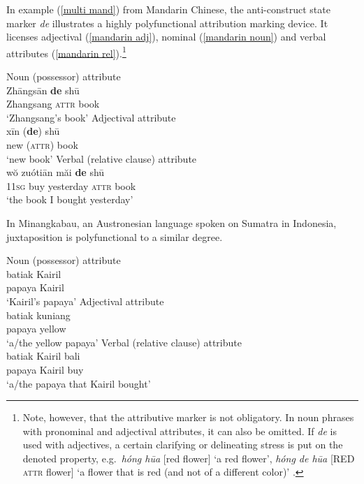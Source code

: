In example (\ref{multi mand}) from Mandarin Chinese, the anti-construct state marker \textit{de} illustrates a highly polyfunctional attribution marking device. It licenses adjectival (\ref{mandarin adj}), nominal (\ref{mandarin noun}) and verbal attributes (\ref{mandarin rel}).\footnote{Note, however, that the attributive marker is not obligatory. In noun phrases with pronominal and adjectival attributes, it can also be omitted. If \textit{de} is used with adjectives, a certain clarifying or delineating stress is put on the denoted property, e.g.~\textit{hóng hūa} [red flower] ‘a red flower’, \textit{hóng de hūa} [RED \textsc{attr} flower] ‘a flower that is red (and not of a different color)’ \citep[119–123]{li-etal1981}.}
\begin{exe}
\ex
{} \label{multi mand}
\begin{xlist}
\ex	\textrm{Noun (possessor) attribute}\\
\gll	Zhāngsān 	\textbf{de} 	shū\\
	Zhangsang 	{\textsc{attr}} 	book\\
\glt	‘Zhangsang's book’\label{mandarin noun}
\ex	\textrm{Adjectival attribute}\\
\gll	xīn 		(\textbf{de}) 	shū\\
	new	 	({\textsc{attr}}) 	book\\
\glt	‘new book’\label{mandarin adj}
\ex	\textrm{Verbal (relative clause) attribute}\\
\gll	wŏ zuótiān 	măi 	\textbf{de} 	shū\\
	1\textsc{1sg} 	buy	yesterday 	{\textsc{attr}} 	book\\
\glt	‘the book I bought yesterday’\label{mandarin rel}
\end{xlist}
\end{exe}
In Minangkabau, an Austronesian language spoken on Sumatra in Indonesia, juxtaposition is polyfunctional to a similar degree.
\begin{exe}
\ex 
{} \label{multi minangkabau}
\begin{xlist}
\ex \textrm{Noun (possessor) attribute}\\
\gll	batiak Kairil\\
	papaya Kairil\\
\glt	‘Kairil's papaya’
\ex \textrm{Adjectival attribute}\\
\gll	batiak kuniang\\
	papaya yellow\\
\glt	‘a/the yellow papaya’
\ex \textrm{Verbal (relative clause) attribute}\\
\gll	batiak Kairil bali\\
	papaya Kairil buy\\
\glt	‘a/the papaya that Kairil bought’
\end{xlist}
\end{exe}
